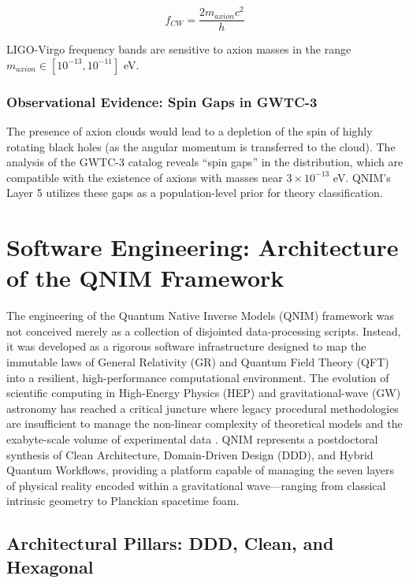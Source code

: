 \documentclass[11pt,a4paper,spanish]{book}
\numberwithin{equation}{chapter}
\numberwithin{figure}{chapter}
\numberwithin{equation}{chapter}
\numberwithin{figure}{chapter}
\numberwithin{table}{chapter}
\begin{document}
\begin{equation}
f_{CW} = \frac{2 m_{axion} c^2}{h}
\end{equation}

LIGO-Virgo frequency bands are sensitive to axion masses in the range $m_{axion} \in [10^{-13}, 10^{-11}]$ eV.

\subsection{Observational Evidence: Spin Gaps in GWTC-3}

The presence of axion clouds would lead to a depletion of the spin of highly rotating black holes (as the angular momentum is transferred to the cloud). The analysis of the GWTC-3 catalog reveals ``spin gaps'' in the distribution, which are compatible with the existence of axions with masses near $3 \times 10^{-13}$ eV. QNIM's Layer 5 utilizes these gaps as a population-level prior for theory classification.


\chapter{Software Engineering: Architecture of the QNIM Framework}
\label{chap:engineering}

The engineering of the Quantum Native Inverse Models (QNIM) framework was not conceived merely as a collection of disjointed data-processing scripts. Instead, it was developed as a rigorous software infrastructure designed to map the immutable laws of General Relativity (GR) and Quantum Field Theory (QFT) into a resilient, high-performance computational environment. The evolution of scientific computing in High-Energy Physics (HEP) and gravitational-wave (GW) astronomy has reached a critical juncture where legacy procedural methodologies are insufficient to manage the non-linear complexity of theoretical models and the exabyte-scale volume of experimental data \cite{cs_uoregon_component}. QNIM represents a postdoctoral synthesis of Clean Architecture, Domain-Driven Design (DDD), and Hybrid Quantum Workflows, providing a platform capable of managing the seven layers of physical reality encoded within a gravitational wave—ranging from classical intrinsic geometry to Planckian spacetime foam.

\section{Architectural Pillars: DDD, Clean, and Hexagonal}
\end{document}
